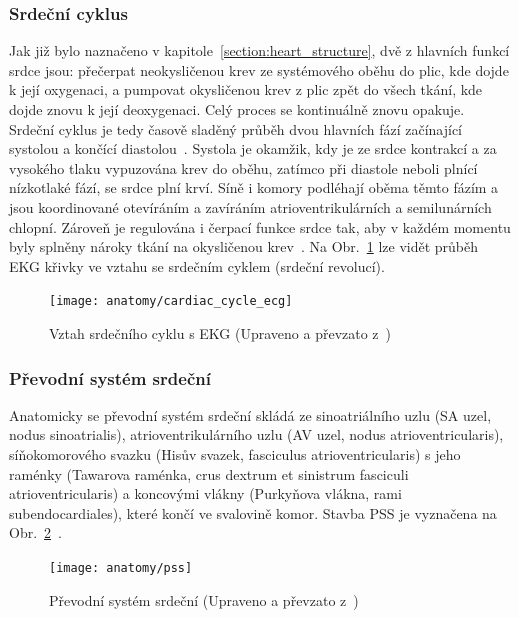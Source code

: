 \subsubsection{Srdeční cyklus}
\label{section:cardiac_cycle}
Jak již bylo naznačeno v kapitole~\ref{section:heart_structure}, dvě z hlavních
funkcí srdce jsou: přečerpat neokysličenou krev ze systémového oběhu do plic,
kde dojde k její oxygenaci, a pumpovat okysličenou krev z plic zpět do všech
tkání, kde dojde znovu k její deoxygenaci. Celý proces se kontinuálně znovu
opakuje. Srdeční cyklus je tedy časově sladěný průběh dvou hlavních fází
začínající systolou a končící diastolou~\cite{Weinhaus2005}. Systola je okamžik,
kdy je ze srdce kontrakcí a za vysokého tlaku vypuzována krev do oběhu, zatímco
při diastole neboli plnící nízkotlaké fází, se srdce plní krví. Síně i komory
podléhají oběma těmto fázím a jsou koordinované otevíráním a zavíráním
atrioventrikulárních a semilunárních chlopní. Zároveň je regulována i čerpací
funkce srdce tak, aby v každém momentu byly splněny nároky tkání na okysličenou
krev~\cite{OpenStax}. Na Obr.~\ref{fig:cardiac_cycle_ecg} lze vidět průběh EKG
křivky ve vztahu se srdečním cyklem (srdeční revolucí).

\begin{figure}[h]
	\begin{center}
		\texttt{[image: anatomy/cardiac\_cycle\_ecg]}
		\caption{Vztah srdečního cyklu s EKG (Upraveno a převzato
		z~\cite{OpenStax})}
		\label{fig:cardiac_cycle_ecg}
	\end{center}
\end{figure}

\subsubsection{Převodní systém srdeční}
\label{section:pss}
Anatomicky se převodní systém srdeční skládá ze sinoatriálního uzlu (SA uzel,
nodus sinoatrialis), atrioventrikulárního uzlu (AV uzel, nodus
atrioventricularis), síňokomorového svazku (Hisův svazek, fasciculus
atrioventricularis) s jeho raménky (Tawarova raménka, crus dextrum et sinistrum
fasciculi atrioventricularis) a koncovými vlákny (Purkyňova vlákna, rami
subendocardiales), které končí ve svalovině komor. Stavba PSS je vyznačena na
Obr.~\ref{fig:pss}~\cite{Dylevsky2013}.

\begin{figure}[h]
	\begin{center}
		\texttt{[image: anatomy/pss]}
		\caption{Převodní systém srdeční (Upraveno a převzato
		z~\cite{ecgpediaConduction})}
		\label{fig:pss}
	\end{center}
\end{figure}

